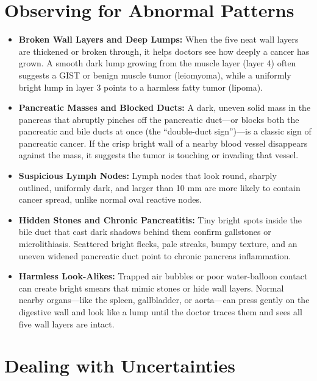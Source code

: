 \section{Observing for Abnormal Patterns}

\begin{itemize}
    \item \textbf{Broken Wall Layers and Deep Lumps:} When the five neat wall layers are thickened or broken through, it helps doctors see how deeply a cancer has grown. A smooth dark lump growing from the muscle layer (layer 4) often suggests a GIST or benign muscle tumor (leiomyoma), while a uniformly bright lump in layer 3 points to a harmless fatty tumor (lipoma).
    \item \textbf{Pancreatic Masses and Blocked Ducts:} A dark, uneven solid mass in the pancreas that abruptly pinches off the pancreatic duct---or blocks both the pancreatic and bile ducts at once (the ``double-duct sign'')---is a classic sign of pancreatic cancer. If the crisp bright wall of a nearby blood vessel disappears against the mass, it suggests the tumor is touching or invading that vessel.
    \item \textbf{Suspicious Lymph Nodes:} Lymph nodes that look round, sharply outlined, uniformly dark, and larger than 10 mm are more likely to contain cancer spread, unlike normal oval reactive nodes.
    \item \textbf{Hidden Stones and Chronic Pancreatitis:} Tiny bright spots inside the bile duct that cast dark shadows behind them confirm gallstones or microlithiasis. Scattered bright flecks, pale streaks, bumpy texture, and an uneven widened pancreatic duct point to chronic pancreas inflammation.
    \item \textbf{Harmless Look-Alikes:} Trapped air bubbles or poor water-balloon contact can create bright smears that mimic stones or hide wall layers. Normal nearby organs---like the spleen, gallbladder, or aorta---can press gently on the digestive wall and look like a lump until the doctor traces them and sees all five wall layers are intact.
\end{itemize}

\section{Dealing with Uncertainties}

